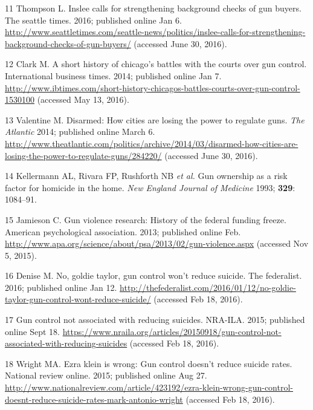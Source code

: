 \documentclass[]{article}
\begin{document}
\hypertarget{ref-thompsonux5finsleeux5f2016}{}
11 Thompson L. Inslee calls for strengthening background checks of gun
buyers. The seattle times. 2016; published online Jan 6.
\url{http://www.seattletimes.com/seattle-news/politics/inslee-calls-for-strengthening-background-checks-of-gun-buyers/}
(accessed June 30, 2016).

\hypertarget{ref-clarkux5fshortux5f2014}{}
12 Clark M. A short history of chicago's battles with the courts over
gun control. International business times. 2014; published online Jan 7.
\url{http://www.ibtimes.com/short-history-chicagos-battles-courts-over-gun-control-1530100}
(accessed May 13, 2016).

\hypertarget{ref-valentineux5fdisarmed:ux5f2014}{}
13 Valentine M. Disarmed: How cities are losing the power to regulate
guns. \emph{The Atlantic} 2014; published online March 6.
\url{http://www.theatlantic.com/politics/archive/2014/03/disarmed-how-cities-are-losing-the-power-to-regulate-guns/284220/}
(accessed June 30, 2016).

\hypertarget{ref-kellermannux5fgunux5f1993}{}
14 Kellermann AL, Rivara FP, Rushforth NB \emph{et al.} Gun ownership as
a risk factor for homicide in the home. \emph{New England Journal of
Medicine} 1993; \textbf{329}: 1084--91.

\hypertarget{ref-jamiesonux5fgunux5f2013}{}
15 Jamieson C. Gun violence research: History of the federal funding
freeze. American psychological association. 2013; published online Feb.
\url{http://www.apa.org/science/about/psa/2013/02/gun-violence.aspx}
(accessed Nov 5, 2015).

\hypertarget{ref-deniseux5fnoux5f2016}{}
16 Denise M. No, goldie taylor, gun control won't reduce suicide. The
federalist. 2016; published online Jan 12.
\url{http://thefederalist.com/2016/01/12/no-goldie-taylor-gun-control-wont-reduce-suicide/}
(accessed Feb 18, 2016).

\hypertarget{ref-ux5fgunux5f2015}{}
17 Gun control not associated with reducing suicides. NRA-ILA. 2015;
published online Sept 18.
\url{https://www.nraila.org/articles/20150918/gun-control-not-associated-with-reducing-suicides}
(accessed Feb 18, 2016).

\hypertarget{ref-wrightux5fezraux5f2015}{}
18 Wright MA. Ezra klein is wrong: Gun control doesn't reduce suicide
rates. National review online. 2015; published online Aug 27.
\url{http://www.nationalreview.com/article/423192/ezra-klein-wrong-gun-control-doesnt-reduce-suicide-rates-mark-antonio-wright}
(accessed Feb 18, 2016).
\end{document}
